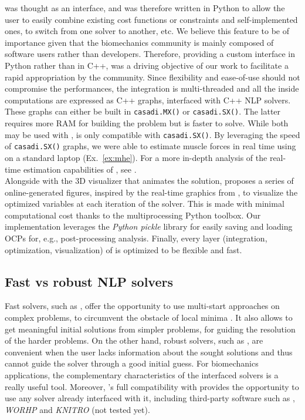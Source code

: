 \bioptim was thought as an interface, and was therefore written in Python to allow the user to easily combine existing cost functions or constraints and self-implemented ones, to switch from one solver to another, etc. 
We believe this feature to be of importance given that the biomechanics community is mainly composed of software users rather than developers.
Therefore, providing a custom interface in Python rather than in C++, was a driving objective of our work to facilitate a rapid appropriation by the community.
Since flexibility and ease-of-use should not compromise the performances, the integration is multi-threaded and all the inside computations are expressed as C++ \casadi graphs, interfaced with C++ NLP solvers.
These graphs can either be built in \texttt{casadi.MX()} or \texttt{casadi.SX()}.
The latter requires more RAM for building the problem but is faster to solve.
While both may be used with \ipopt, \acados is only compatible with \texttt{casadi.SX()}.
By leveraging the speed of \texttt{casadi.SX()} graphs, we were able to estimate muscle forces in real time using \acados on a standard laptop (Ex.~\ref{ex:mhe}).
For a more in-depth analysis of the real-time estimation capabilities of \bioptim, see \cite{bailly2020real}.\\
Alongside with the 3D visualizer \bioviz that animates the solution, \bioptim proposes a series of online-generated figures, inspired by the  real-time graphics from \muscodii \cite{leineweber2003efficient1, leineweber2003efficient2}, to visualize the optimized variables at each iteration of the solver.
This is made with minimal computational cost thanks to the multiprocessing Python toolbox. 
Our implementation leverages the \textit{Python pickle} library for easily saving and loading OCPs for, e.g., post-processing analysis.
Finally, every layer (integration, optimization, visualization) of \bioptim is optimized to be flexible and fast.

\subsection{Fast vs robust NLP solvers}

Fast solvers, such as \acados, offer the opportunity to use multi-start approaches on complex problems, to circumvent the obstacle of local minima \cite{huchez2015local, bailly2020optimal}.
It also allows to get meaningful initial solutions from simpler problems, for guiding the resolution of the harder problems.
On the other hand, robust solvers, such as \ipopt, are convenient when the user lacks information about the sought solutions and thus cannot guide the solver through a good initial guess.
For biomechanics applications, the complementary characteristics of the interfaced solvers is a really useful tool.
Moreover, \bioptim's full compatibility with \casadi provides the opportunity to use any solver already interfaced with it, including third-party software such as \snopt, \textit{WORHP} \cite{wassel2013exploring} and \textit{KNITRO} \cite{nocedal2006knitro} (not tested yet). 

